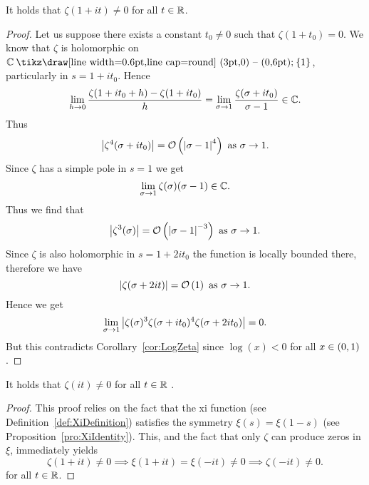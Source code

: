 \begin{theorem}
	It holds that $\zeta(1 + it) \neq 0$ for all $t \in \mathbb{R}$.
\end{theorem}
\begin{proof}
	Let us suppose there exists a constant $t_0 \neq 0$ such that $\zeta(1 + t_0) = 0$. We know that $\zeta$ is holomorphic on $\field{C} \mysetminus \{1\}$, particularly in $s = 1 + it_0$. Hence
\begin{equation*}
	\lim\limits_{h \to 0} \frac{\zeta(1 + it_0 + h) - \zeta(1 + it_0)}{h} = \lim\limits_{\sigma \to 1} \frac{\zeta(\sigma + it_0)}{\sigma - 1} \in \mathbb{C}.
\end{equation*}
	Thus
\begin{equation*}
	\left|\zeta^4(\sigma + it_0)\right| = \mathcal{O}\left(\left|\sigma - 1\right|^4\right) \text{ as } \sigma \to 1.
\end{equation*}
	Since $\zeta$ has a simple pole in $s = 1$ we get
\begin{equation*}
	\lim\limits_{\sigma \to 1}\zeta(\sigma) (\sigma - 1) \in \mathbb{C}.
\end{equation*}
	Thus we find that
\begin{equation*}
	 \left|\zeta^3(\sigma)\right| = \mathcal{O}\left(\left|\sigma - 1\right|^{-3}\right) \text{ as } \sigma \to 1.
\end{equation*}
	Since $\zeta$ is also holomorphic in $s = 1 + 2it_0$ the function is locally bounded there, therefore we have
\begin{equation*}
	 \left|\zeta(\sigma + 2it)\right| = \mathcal{O}\left(1\right) \text{ as } \sigma \to 1.
\end{equation*}
	Hence we get
\begin{equation*}
	 \lim\limits_{\sigma \to 1} \left|\zeta(\sigma)^3 \zeta(\sigma + it_0)^4 \zeta(\sigma + 2it_0)\right| = 0.
\end{equation*}
	But this contradicts Corollary~\ref{cor:LogZeta} since $\log(x) < 0$ for all $x \in \left(0 , 1\right)$.
\end{proof}


\begin{corollary}
	It holds that $\zeta(it) \neq 0$ for all $t \in \mathbb{R}$ .
\end{corollary}
\begin{proof}
	This proof relies on the fact that the xi function (see Definition~\ref{def:XiDefinition}) satisfies the symmetry $\xi(s) = \xi(1 - s)$ (see Proposition~\ref{pro:XiIdentity}). This, and the fact that only $\zeta$ can produce zeros in $\xi$, immediately yields
\begin{equation*}
	\zeta(1 + it) \neq 0 \implies \xi(1 + it) = \xi(-it) \neq 0 \implies \zeta(-it) \neq 0.	
\end{equation*}
	for all $t \in \mathbb{R}$.
\end{proof}


